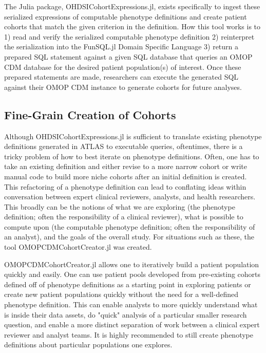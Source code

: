 \documentclass{juliacon}
\begin{document}
The Julia package, OHDSICohortExpressions.jl, exists specifically to ingest these serialized expressions of computable phenotype definitions and create patient cohorts that match the given criterion in the definition.
How this tool works is to 1) read and verify the serialized computable phenotype definition 2) reinterpret the serialization into the FunSQL.jl Domain Specific Language 3) return a prepared SQL statement against a given SQL database that queries an OMOP CDM database for the desired patient population(s) of interest.
Once these prepared statements are made, researchers can execute the generated SQL against their OMOP CDM instance to generate cohorts for future analyses.

\subsection{Fine-Grain Creation of Cohorts}

Although OHDSICohortExpressions.jl is sufficient to translate existing phenotype definitions generated in ATLAS to executable queries, oftentimes, there is a tricky problem of how to best iterate on phenotype definitions.
Often, one has to take an existing definition and either revise to a more narrow cohort or write manual code to build more niche cohorts after an initial definition is created.
This refactoring of a phenotype definition can lead to conflating ideas within conversation between expert clinical reviewers, analysts, and health researchers.
This broadly can be the notions of what we are exploring (the phenotype definition; often the responsibility of a clinical reviewer), what is possible to compute upon (the computable phenotype definition; often the responsibility of an analyst), and the goals of the overall study.
For situations such as these, the tool OMOPCDMCohortCreator.jl was created.

OMOPCDMCohortCreator.jl allows one to iteratively build a patient population quickly and easily.
One can use patient pools developed from pre-existing cohorts defined off of phenotype definitions as a starting point in exploring patients or create new patient populations quickly without the need for a well-defined phenotype definition.
This can enable analysts to more quickly understand what is inside their data assets, do "quick" analysis of a particular smaller research question, and enable a more distinct separation of work between a clinical expert reviewer and analyst teams.
It is highly recommended to still create phenotype definitions about particular populations one explores.
\end{document}
